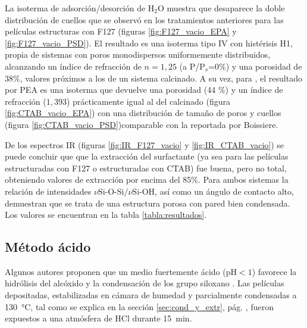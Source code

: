 		 La isoterma de adsorción/desorción de H$_2$O muestra que desaparece la doble distribución de cuellos que se observó en los tratamientos anteriores para las películas estructuras con F127 (figuras \ref{fig:F127_vacio_EPA} y \ref{fig:F127_vacio_PSD}). El resultado es una isoterma tipo IV con histérisis H1, propia de sistemas con poros monodispersos uniformemente distribuidos, alcanzando un índice de refracción de $n=1,25$ (a P/P$_s$=0\%) y una porosidad de $38\%$, valores próximos a los de un sistema calcinado. A su vez, para \pdmC, el resultado por PEA es una isoterma que devuelve una porosidad (44 \%) y un índice de refracción ($1,393$) prácticamente igual al del calcinado (figura \ref{fig:CTAB_vacio_EPA}) con una distribución de tamaño de poros y cuellos (figura \ref{fig:CTAB_vacio_PSD})comparable con la reportada por Boissiere\cite{Boissiere2005}.

		 De los espectros IR  (figuras \ref{fig:IR_F127_vacio} y \ref{fig:IR_CTAB_vacio}) se puede concluir que que la extracción del surfactante (ya sea para las películas estructuradas con F127 o estructuradas con CTAB) fue buena, pero no total, obteniendo valores de extracción por encima del 85\%. Para ambos sistemas la relación de intensidades $\nu{\text{Si-O-Si/}}\nu{\text{Si-OH}}$, así como un ángulo de contacto alto, demuestran que se trata de una estructura porosa con pared bien condensada. Los valores se encuentran en la tabla \ref{tabla:resultados}.


	 \subsection{Método ácido}

	 	 Algunos autores proponen que un medio fuertemente ácido (pH$<1$) favorece la hidrólisis del alcóxido y la condensación de los grupo siloxano \cite{Soler-Illia2011,Doshi2000a,Huo1996,Boissiere2000,Beck1992}. Las películas depositadas, estabilizadas en cámara de humedad y  parcialmente condensadas a \SI{130}{\celsius}, tal como se explica en la sección \ref{sec:cond_y_extr}, pág. \pageref{sec:cond_y_extr}, fueron expuestos a una atmósfera de HCl durante \SI{15}{\minute}. 

